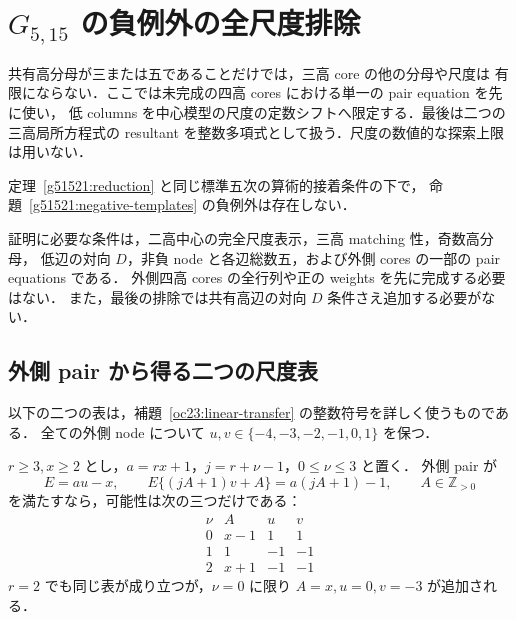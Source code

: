 \section{\texorpdfstring{$G_{5,15}$}{G5,15} の負例外の全尺度排除}
\label{ne23:section}

共有高分母が三または五であることだけでは，三高 core の他の分母や尺度は
有限にならない．ここでは未完成の四高 cores における単一の pair equation を先に使い，
低 columns を中心模型の尺度の定数シフトへ限定する．最後は二つの三高局所方程式の
resultant を整数多項式として扱う．尺度の数値的な探索上限は用いない．

\begin{theorem}
\label{ne23:no-negative-exception}
定理~\ref{g51521:reduction} と同じ標準五次の算術的接着条件の下で，
命題~\ref{g51521:negative-templates} の負例外は存在しない．
\end{theorem}

証明に必要な条件は，二高中心の完全尺度表示，三高 matching 性，奇数高分母，
低辺の対向 $D$，非負 node と各辺総数五，および外側 cores の一部の pair equations である．
外側四高 cores の全行列や正の weights を先に完成する必要はない．
また，最後の排除では共有高辺の対向 $D$ 条件さえ追加する必要がない．

\subsection{外側 pair から得る二つの尺度表}

以下の二つの表は，補題~\ref{oc23:linear-transfer} の整数符号を詳しく使うものである．
全ての外側 node について $u,v\in\{-4,-3,-2,-1,0,1\}$ を保つ．

\begin{lemma}
\label{ne23:positive-transfer}
$r\ge3,x\ge2$ とし，$a=rx+1$，$j=r+\nu-1$，$0\le\nu\le3$ と置く．
外側 pair が
\[
 E=au-x,\qquad
 E\{(jA+1)v+A\}=a(jA+1)-1,\qquad A\in\mathbb Z_{>0}
\]
を満たすなら，可能性は次の三つだけである：
\[
\begin{array}{c|c|c|c}
\nu&A&u&v\\\hline
0&x-1&1&1\\
1&1&-1&-1\\
2&x+1&-1&-1
\end{array}
\]
$r=2$ でも同じ表が成り立つが，$\nu=0$ に限り
$A=x,u=0,v=-3$ が追加される．
\end{lemma}

